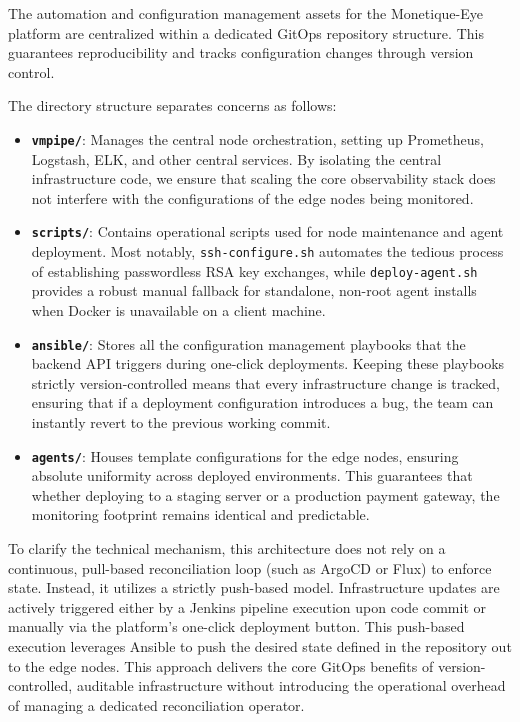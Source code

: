 \documentclass[12pt,a4paper]{report}
\begin{document}
The automation and configuration management assets for the Monetique-Eye platform are centralized within a dedicated GitOps repository structure. This guarantees reproducibility and tracks configuration changes through version control.

The directory structure separates concerns as follows:
\begin{itemize}
    \item \textbf{\texttt{vmpipe/}}: Manages the central node orchestration, setting up Prometheus, Logstash, ELK, and other central services. By isolating the central infrastructure code, we ensure that scaling the core observability stack does not interfere with the configurations of the edge nodes being monitored.
    \item \textbf{\texttt{scripts/}}: Contains operational scripts used for node maintenance and agent deployment. Most notably, \texttt{ssh-configure.sh} automates the tedious process of establishing passwordless RSA key exchanges, while \texttt{deploy-agent.sh} provides a robust manual fallback for standalone, non-root agent installs when Docker is unavailable on a client machine.
    \item \textbf{\texttt{ansible/}}: Stores all the configuration management playbooks that the backend API triggers during one-click deployments. Keeping these playbooks strictly version-controlled means that every infrastructure change is tracked, ensuring that if a deployment configuration introduces a bug, the team can instantly revert to the previous working commit.
    \item \textbf{\texttt{agents/}}: Houses template configurations for the edge nodes, ensuring absolute uniformity across deployed environments. This guarantees that whether deploying to a staging server or a production payment gateway, the monitoring footprint remains identical and predictable.
\end{itemize}

To clarify the technical mechanism, this architecture does not rely on a continuous, pull-based reconciliation loop (such as ArgoCD or Flux) to enforce state. Instead, it utilizes a strictly push-based model. Infrastructure updates are actively triggered either by a Jenkins pipeline execution upon code commit or manually via the platform's one-click deployment button. This push-based execution leverages Ansible to push the desired state defined in the repository out to the edge nodes. This approach delivers the core GitOps benefits of version-controlled, auditable infrastructure without introducing the operational overhead of managing a dedicated reconciliation operator.
\end{document}
